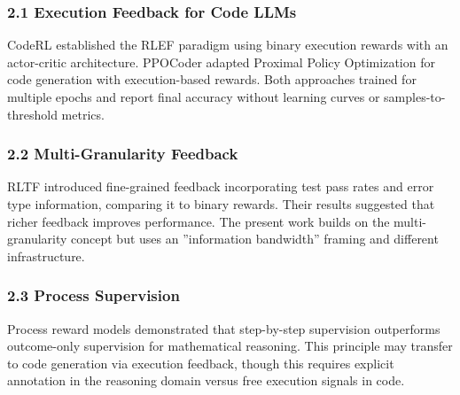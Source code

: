 
\subsubsection{2.1 Execution Feedback for Code LLMs}

CodeRL \citep{le2022coderl} established the RLEF paradigm using binary execution rewards with an actor-critic architecture. PPOCoder \citep{shojaee2023ppocoder} adapted Proximal Policy Optimization for code generation with execution-based rewards. Both approaches trained for multiple epochs and report final accuracy without learning curves or samples-to-threshold metrics.

\subsubsection{2.2 Multi-Granularity Feedback}

RLTF \citep{liu2023rltf} introduced fine-grained feedback incorporating test pass rates and error type information, comparing it to binary rewards. Their results suggested that richer feedback improves performance. The present work builds on the multi-granularity concept but uses an ''information bandwidth'' framing and different infrastructure.

\subsubsection{2.3 Process Supervision}

Process reward models \citep{lightman2023verify} demonstrated that step-by-step supervision outperforms outcome-only supervision for mathematical reasoning. This principle may transfer to code generation via execution feedback, though this requires explicit annotation in the reasoning domain versus free execution signals in code.
